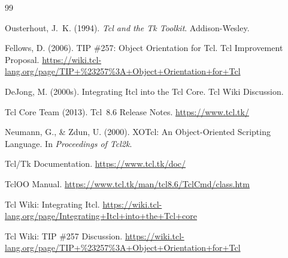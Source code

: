 \begin{thebibliography}{99}

Ousterhout, J.~K. (1994).
\textit{Tcl and the Tk Toolkit}.
Addison-Wesley.

Fellows, D. (2006).
TIP \#257: Object Orientation for Tcl.
Tcl Improvement Proposal.
\url{https://wiki.tcl-lang.org/page/TIP+%23257%3A+Object+Orientation+for+Tcl}

DeJong, M. (2000s).
Integrating Itcl into the Tcl Core.
Tcl Wiki Discussion.

Tcl Core Team (2013).
Tcl~8.6 Release Notes.
\url{https://www.tcl.tk/}

Neumann, G., \& Zdun, U. (2000).
XOTcl: An Object-Oriented Scripting Language.
In \textit{Proceedings of Tcl2k}.

Tcl/Tk Documentation.
\url{https://www.tcl.tk/doc/}

TclOO Manual.
\url{https://www.tcl.tk/man/tcl8.6/TclCmd/class.htm}

Tcl Wiki: Integrating Itcl.
\url{https://wiki.tcl-lang.org/page/Integrating+Itcl+into+the+Tcl+core}

Tcl Wiki: TIP \#257 Discussion.
\url{https://wiki.tcl-lang.org/page/TIP+%23257%3A+Object+Orientation+for+Tcl}

\end{thebibliography}
